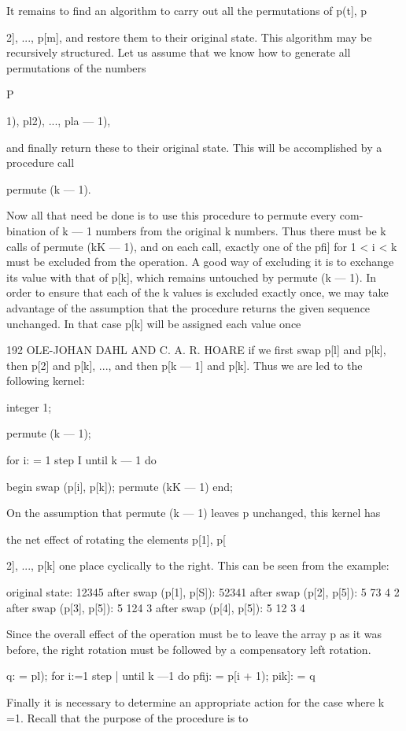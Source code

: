 It remains to find an algorithm to carry out all the permutations of p(t], p{2], ..., p[m], and restore them to their original state. This algorithm may be recursively structured. Let us assume that we know how to generate all permutations of the numbers

P{1), pl2), ..., pla — 1),

and finally return these to their original state. This will be accomplished by a procedure call

permute (k — 1).

Now all that need be done is to use this procedure to permute every com- bination of k — 1 numbers from the original k numbers. Thus there must be k calls of permute (kK — 1), and on each call, exactly one of the pfi] for 1 < i < k must be excluded from the operation. A good way of excluding it is to exchange its value with that of p[k], which remains untouched by permute (k — 1). In order to ensure that each of the k values is excluded exactly once, we may take advantage of the assumption that the procedure returns the given sequence unchanged. In that case p[k] will be assigned each value once

192 OLE-JOHAN DAHL AND C. A. R. HOARE if we first swap p[l] and p[k], then p[2] and p[k], ..., and then p[k — 1] and p[k]. Thus we are led to the following kernel:

integer 1;

permute (k — 1);

for i: = 1 step I until k — 1 do

begin swap (p[i], p[k]); permute (kK — 1) end;

On the assumption that permute (k — 1) leaves p unchanged, this kernel has

the net effect of rotating the elements p[1], p[{2], ..., p[k] one place cyclically to the right. This can be seen from the example:

original state: 12345 after swap (p[1], p[S]): 52341 after swap (p[2], p[5]): 5 73 4 2 after swap (p[3], p[5]): 5 124 3 after swap (p[4], p[5]): 5 12 3 4

Since the overall effect of the operation must be to leave the array p as it was before, the right rotation must be followed by a compensatory left rotation.

q: = pl); for i:=1 step | until k —1 do pfij: = p[i + 1); pik]: = q

Finally it is necessary to determine an appropriate action for the case where k =1. Recall that the purpose of the procedure is to

}}}

